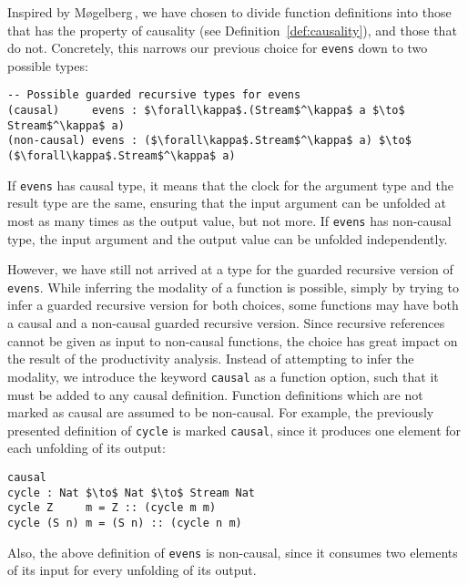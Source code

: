 Inspired by M\o gelberg\,\citep{Mogelberg:2014}, we have chosen to divide
function definitions into those that has the property of causality (see
Definition~\ref{def:causality}), and those that do not. Concretely, this narrows
our previous choice for \texttt{evens} down to two possible types:
\begin{lstlisting}[mathescape,title=\ttBlock]
-- Possible guarded recursive types for evens
(causal)     evens : $\forall\kappa$.(Stream$^\kappa$ a $\to$ Stream$^\kappa$ a)         
(non-causal) evens : ($\forall\kappa$.Stream$^\kappa$ a) $\to$ ($\forall\kappa$.Stream$^\kappa$ a)
\end{lstlisting}
If \texttt{evens} has causal type, it means that the clock for the argument type
and the result type are the same, ensuring that the input argument can be
unfolded at most as many times as the output value, but not more. If
\texttt{evens} has non-causal type, the input argument and the output value can
be unfolded independently. 

However, we have still not arrived at a type for the guarded recursive version
of \texttt{evens}. While inferring the modality of a function is possible,
simply by trying to infer a guarded recursive version for both choices, some
functions may have both a causal and a non-causal guarded recursive
version. Since recursive references cannot be given as input to non-causal
functions, the choice has great impact on the result of the productivity
analysis. Instead of attempting to infer the modality, we introduce the keyword
\texttt{causal} as a function option, such that it must be added to any causal
definition. Function definitions which are not marked as causal are assumed to
be non-causal. For example, the previously presented definition of
\texttt{cycle} is marked \texttt{causal}, since it produces one element for each
unfolding of its output:
\begin{lstlisting}[mathescape,title=\idrisBlock]
causal
cycle : Nat $\to$ Nat $\to$ Stream Nat
cycle Z     m = Z :: (cycle m m)
cycle (S n) m = (S n) :: (cycle n m)
\end{lstlisting}
Also, the above definition of \texttt{evens} is non-causal, since it consumes two
elements of its input for every unfolding of its output.

